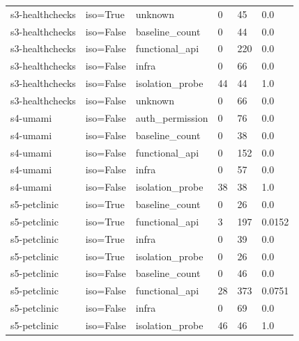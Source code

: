 \begin{table}[t]
\begin{tabular}{llllll}
s3-healthchecks & iso=True & unknown & 0 & 45 & 0.0 \\
s3-healthchecks & iso=False & baseline\_count & 0 & 44 & 0.0 \\
s3-healthchecks & iso=False & functional\_api & 0 & 220 & 0.0 \\
s3-healthchecks & iso=False & infra & 0 & 66 & 0.0 \\
s3-healthchecks & iso=False & isolation\_probe & 44 & 44 & 1.0 \\
s3-healthchecks & iso=False & unknown & 0 & 66 & 0.0 \\
s4-umami & iso=False & auth\_permission & 0 & 76 & 0.0 \\
s4-umami & iso=False & baseline\_count & 0 & 38 & 0.0 \\
s4-umami & iso=False & functional\_api & 0 & 152 & 0.0 \\
s4-umami & iso=False & infra & 0 & 57 & 0.0 \\
s4-umami & iso=False & isolation\_probe & 38 & 38 & 1.0 \\
s5-petclinic & iso=True & baseline\_count & 0 & 26 & 0.0 \\
s5-petclinic & iso=True & functional\_api & 3 & 197 & 0.0152 \\
s5-petclinic & iso=True & infra & 0 & 39 & 0.0 \\
s5-petclinic & iso=True & isolation\_probe & 0 & 26 & 0.0 \\
s5-petclinic & iso=False & baseline\_count & 0 & 46 & 0.0 \\
s5-petclinic & iso=False & functional\_api & 28 & 373 & 0.0751 \\
s5-petclinic & iso=False & infra & 0 & 69 & 0.0 \\
s5-petclinic & iso=False & isolation\_probe & 46 & 46 & 1.0 \\
\hline
\end{tabular}
\end{table}
